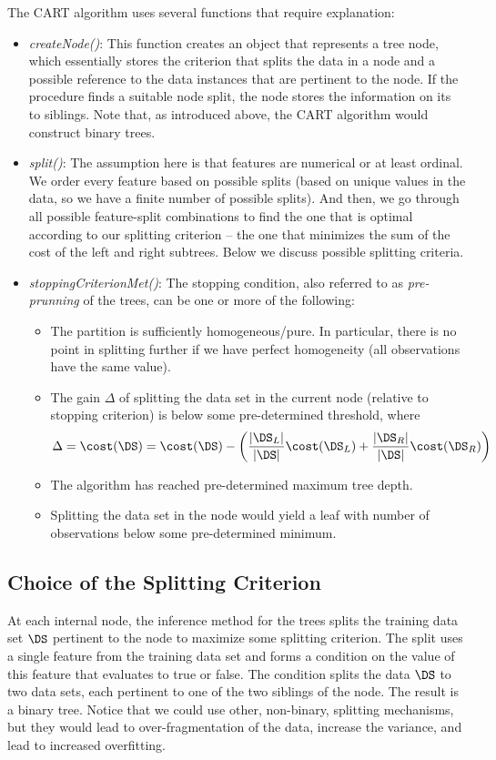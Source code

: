\begin{refsection}
The CART algorithm uses several functions that require explanation:
\begin{itemize}
\item {\em createNode()}: This function creates an object that represents a tree node, which essentially stores the criterion that splits the data in a node and a possible reference to the data instances that are pertinent to the node. If the procedure finds a suitable node split, the node stores the information on its to siblings. Note that, as introduced above, the CART algorithm would construct binary trees.
\item {\em split()}: The assumption here is that features are numerical or at least ordinal. We order every feature based on possible splits (based on unique values in the data, so we have a finite number of possible splits). And then, we go through all possible feature-split combinations to find the one that is optimal according to our splitting criterion -- the one that minimizes the sum of the cost of the left and right subtrees. Below we discuss possible splitting criteria.

\item {\em stoppingCriterionMet()}: The stopping condition, also referred to as {\em pre-prunning} of the trees, can be one or more of the following:
\begin{itemize}
\item The partition is sufficiently homogeneous/pure. In particular, there is no point in splitting further if we have perfect homogeneity (all observations have the same value).
\item The gain $\Delta$ of splitting the data set in the current node (relative to stopping criterion) is below some pre-determined threshold, where
$$ \Delta = \cost(\DS) = \cost(\DS)-\left({|\DS_L|\over |\DS|}\cost(\DS_L) + {|\DS_R|\over |\DS|}\cost(\DS_R)\right)$$
\item The algorithm has reached pre-determined maximum tree depth.
\item Splitting the data set in the node would yield a leaf with number of observations below some pre-determined minimum.
\end{itemize}
\end{itemize}


\subsection*{Choice of the Splitting Criterion}

At each internal node, the inference method for the trees splits the training data set $\DS$ pertinent to the node to maximize some splitting criterion. The split uses a single feature from the training data set and forms a condition on the value of this feature that evaluates to true or false. The condition splits the data $\DS$ to two data sets, each pertinent to one of the two siblings of the node. The result is a binary tree. Notice that we could use other, non-binary, splitting mechanisms, but they would lead to over-fragmentation of the data, increase the variance, and lead to increased overfitting.


\end{refsection}
